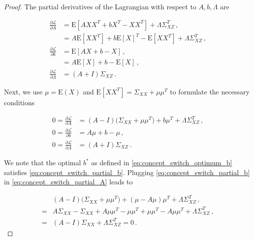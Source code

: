 \begin{proof}
The partial derivatives of the Lagrangian with respect to $A, b, \Lambda$ are

\begin{align*}
    \frac{\partial \mathcal{L}}{\partial A} &= \mathrm{E}[AXX^T + bX^T - XX^T] + \Lambda\Sigma^T_{XZ} \, , \\
    &= A\mathrm{E}[XX^T] + b\mathrm{E}[X]^T - \mathrm{E}[XX^T] + \Lambda\Sigma^T_{XZ} \, , \\
    \frac{\partial \mathcal{L}}{\partial b} &= \mathrm{E}[AX + b - X] \, ,\\
    &= A\mathrm{E}[X] + b - \mathrm{E}[X] \, ,\\
    \frac{\partial \mathcal{L}}{\partial \Lambda} &= (A+I) \Sigma_{XZ} \, .
\end{align*}

Next, we use $\mu = \mathrm{E}(X)$ and $\mathrm{E}[XX^T] = \Sigma_{XX} + \mu \mu^T$ to formulate the necessary conditions 

\begin{align}
    \label{eq:concept_switch_partial_A}
    0 = \frac{\partial \mathcal{L}}{\partial A} &= (A-I)\Big( \Sigma_{XX} + \mu \mu^T \Big) + b \mu^T + \Lambda\Sigma^T_{XZ} \, ,\\
    \label{eq:concept_switch_partial_b}
    0 = \frac{\partial \mathcal{L}}{\partial b} &= A \mu + b - \mu \, ,\\
    \label{eq:concept_switch_partial_lambda}
    0 = \frac{\partial \mathcal{L}}{\partial \Lambda} &= (A+I) \Sigma_{XZ} \, .
\end{align}

We note that the optimal $b^*$ as defined in \eqref{eq:concept_switch_optimum_b} satisfies \ref{eq:concept_switch_partial_b}. Plugging \eqref{eq:concept_switch_partial_b} in \eqref{eq:concept_switch_partial_A} leads to

\begin{align}    
    &(A - I)\Big(\Sigma_{XX} + \mu \mu^T\Big) + (\mu - A\mu) \mu^T + \Lambda \Sigma_{XZ}^T \, , \nonumber\\
    {} = {} &A \Sigma_{XX} - \Sigma_{XX} + A \mu \mu^T - \mu \mu^T + \mu\mu^T - A\mu \mu^T + \Lambda \Sigma_{XZ}^T \, , \nonumber\\
    {} = {} &(A - I) \Sigma_{XX} + \Lambda \Sigma_{XZ}^T = 0 \, . \label{eq:concept_switch_partial_A_rewritten}
\end{align}


\end{proof}

